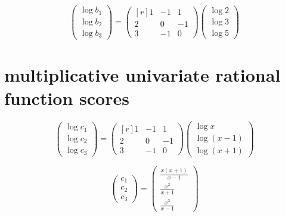 \documentclass{article}
\begin{document}

\begin{equation*}
\begin{pmatrix*}
\log{b_1} \\
\log{b_2} \\
\log{b_3}
\end{pmatrix*}
=
\begin{pmatrix*}[r]
1 & -1 & 1 \\
2 & 0 & -1 \\
3 & -1 & 0
\end{pmatrix*}
\begin{pmatrix*}
\log{2} \\
\log{3} \\
\log{5}
\end{pmatrix*}
\end{equation*}



\section*{multiplicative univariate rational function scores}



\begin{equation*}
\begin{pmatrix*}
\log{c_1} \\
\log{c_2} \\
\log{c_3}
\end{pmatrix*}
=
\begin{pmatrix*}[r]
1 & -1 & 1 \\
2 & 0 & -1 \\
3 & -1 & 0
\end{pmatrix*}
\begin{pmatrix*}
\log{x} \\
\log{\left(x - 1\right)} \\
\log{\left(x + 1\right)}
\end{pmatrix*}
\end{equation*}

\begin{equation*}
\begin{pmatrix*}
c_1 \\
c_2 \\
c_3
\end{pmatrix*}
=
\begin{pmatrix*}
\frac{x \left( x + 1 \right)}{x-1} \\
\frac{x^2}{x+1} \\
\frac{x^3}{x-1}
\end{pmatrix*}
\end{equation*}
\end{document}
